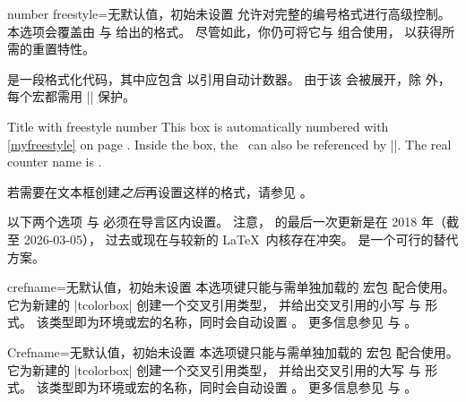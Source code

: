\begin{newTcbKey}{number freestyle}{=}{无默认值，初始未设置}
  允许对完整的编号格式进行高级控制。本选项会覆盖由
   与  给出的格式。
  尽管如此，你仍可将它与  组合使用，
  以获得所需的重置特性。\par
  是一段格式化代码，其中应包含  以引用自动计数器。
  由于该 会被展开，除  外，
  每个宏都需用 |\noexpand| 保护。


\begin{dispExample}
\begin{phbox}[label={myfreestyle}]{Title with freestyle number}
This box is automatically numbered with \ref{myfreestyle} on page
\pageref{myfreestyle}. Inside the box, the \thetcbcounter\ can
also be referenced by |\thetcbcounter|.
The real counter name is \texttt{\tcbcounter}.
\end{phbox}
\end{dispExample}

若需要在文本框创建\emph{之后}再设置这样的格式，请参见 。
\end{newTcbKey}

\clearpage
\begin{marker}
以下两个选项  与 
必须在导言区内设置。
注意， 的最后一次更新是在 2018 年（截至 2026-03-05），
过去或现在与较新的 \LaTeX\ 内核存在冲突。 是一个可行的替代方案。
\end{marker}

\begin{newTcbKey}[][doc updated=2014-12-01]{crefname}{=}{无默认值，初始未设置}
  本选项键只能与需单独加载的  宏包 \cite{cubitt:2018a} 配合使用。
  它为新建的 |tcolorbox| 创建一个交叉引用类型，
  并给出交叉引用的小写  与  形式。
  该类型即为环境或宏的名称，同时会自动设置 。
  更多信息参见  与 \cite{cubitt:2018a}。
\end{newTcbKey}


\begin{newTcbKey}[][doc updated=2014-12-01]{Crefname}{=}{无默认值，初始未设置}
  本选项键只能与需单独加载的  宏包 \cite{cubitt:2018a} 配合使用。
  它为新建的 |tcolorbox| 创建一个交叉引用类型，
  并给出交叉引用的大写  与  形式。
  该类型即为环境或宏的名称，同时会自动设置 。
  更多信息参见  与 \cite{cubitt:2018a}。
\end{newTcbKey}

